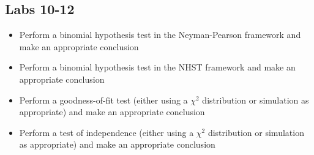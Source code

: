 \documentclass[11pt]{article} %
\begin{document}
\subsection{Labs 10-12}

\begin{itemize}
\item Perform a binomial hypothesis test in the Neyman-Pearson framework and make an appropriate conclusion
\item Perform a binomial hypothesis test in the NHST framework and make an appropriate conclusion
\item Perform a goodness-of-fit test (either using a $\chi^2$ distribution or simulation as appropriate) and make an appropriate conclusion
\item Perform a test of independence (either using a $\chi^2$ distribution or simulation as appropriate) and make an appropriate conclusion
\end{itemize}
\end{document}

